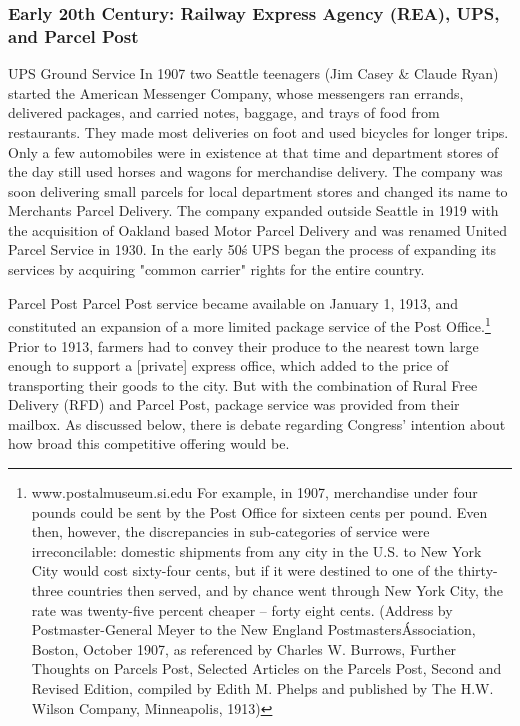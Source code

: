 \subsubsection{Early 20th Century: Railway Express Agency (REA), UPS, and Parcel Post}
UPS Ground Service  In 1907 two Seattle teenagers (Jim Casey \& Claude Ryan) started the American Messenger Company, whose messengers ran errands, delivered packages, and carried notes, baggage, and trays of food from restaurants. They made most deliveries on foot and used bicycles for longer trips. Only a few automobiles were in existence at that time and department stores of the day still used horses and wagons for merchandise delivery. The company was soon delivering small parcels for local department stores and changed its name to Merchants Parcel Delivery. The company expanded outside Seattle in 1919 with the acquisition of Oakland based Motor Parcel Delivery and was renamed United Parcel Service in 1930. In the early 50\'s UPS began the process of expanding its services by acquiring "common carrier" rights for the entire country. 

Parcel Post  Parcel Post service became available on January 1, 1913, and constituted an expansion of a more limited package service of the Post Office.\footnote{www.postalmuseum.si.edu For example, in 1907, merchandise under four pounds could be sent by the Post Office for sixteen cents per pound.  Even then, however, the discrepancies in sub-categories of service were irreconcilable: domestic shipments from any city in the U.S. to New York City would cost sixty-four cents, but if it were destined to one of the thirty-three countries then served, and by chance went through New York City, the rate was twenty-five percent cheaper -- forty eight cents. (Address by Postmaster-General Meyer to the New England Postmasters\' Association, Boston, October 1907, as referenced by Charles W. Burrows, Further Thoughts on Parcels Post,  Selected Articles on the Parcels Post, Second and Revised Edition, compiled by Edith M. Phelps and published by The H.W. Wilson Company, Minneapolis, 1913)}  Prior to 1913, farmers had to convey their produce to the nearest town large enough to support a [private] express office, which added to the price of transporting their goods to the city. But with the combination of Rural Free Delivery (RFD) and Parcel Post, package service was provided from their mailbox.  As discussed below, there is debate regarding Congress’ intention about how broad this competitive offering would be.

